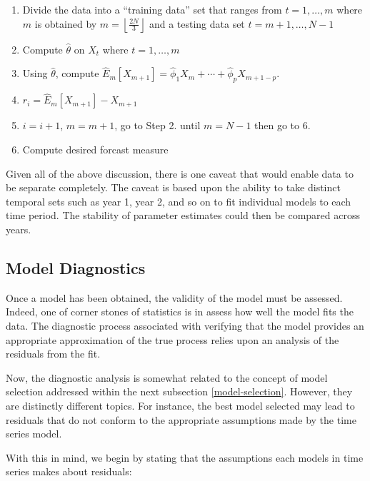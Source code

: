\documentclass[]{book}
\providecommand{\tightlist}{%
  \setlength{\itemsep}{0pt}\setlength{\parskip}{0pt}}
\theoremstyle{definition}
\theoremstyle{definition}
\theoremstyle{definition}
\theoremstyle{remark}
\begin{document}
{\begin{enumerate}
\def\labelenumi{\arabic{enumi}.}
\tightlist
\item
  Divide the data into a ``training data'' set that ranges from
  \(t = 1, \ldots, m\) where \(m\) is obtained by
  \(m=\left \lfloor \frac{2N}{3} \right \rfloor\) and a testing data set
  \(t = m+1, \ldots, N-1\)
\item
  Compute \(\hat{\theta}\) on \(X_t\) where \(t = 1, \ldots, m\)
\item
  Using \(\hat{\theta}\), compute
  \({\hat E_m}\left[ {{X_{m + 1}}} \right] = {\hat \phi _1}{X_m} + \cdots + {\hat \phi _p}{X_{m + 1 - p}}\).
\item
  \({r_i} = {\hat E_m}\left[ {{X_{m + 1}}} \right] - {X_{m + 1}}\)
\item
  \(i = i + 1\), \(m = m + 1\), go to Step 2. until \(m = N - 1\) then
  go to 6.
\item
  Compute desired forcast measure
\end{enumerate}

Given all of the above discussion, there is one caveat that would enable
data to be separate completely. The caveat is based upon the ability to
take distinct temporal sets such as year 1, year 2, and so on to fit
individual models to each time period. The stability of parameter
estimates could then be compared across years.

\hypertarget{model-diagnostics}{%
\subsection{Model Diagnostics}\label{model-diagnostics}}

Once a model has been obtained, the validity of the model must be
assessed. Indeed, one of corner stones of statistics is in assess how
well the model fits the data. The diagnostic process associated with
verifying that the model provides an appropriate approximation of the
true process relies upon an analysis of the residuals from the fit.

Now, the diagnostic analysis is somewhat related to the concept of model
selection addressed within the next subsection \ref{model-selection}.
However, they are distinctly different topics. For instance, the best
model selected may lead to residuals that do not conform to the
appropriate assumptions made by the time series model.

With this in mind, we begin by stating that the assumptions each models
in time series makes about residuals:

}
\end{document}
